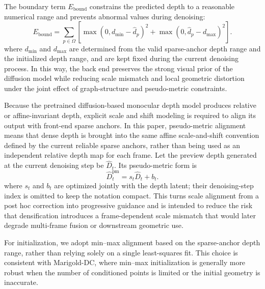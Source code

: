 \documentclass[pdflatex,sn-mathphys-num]{sn-jnl}
\begin{document}
The boundary term $E_{\mathrm{bound}}$ constrains the predicted depth to a reasonable numerical range and prevents abnormal values during denoising:
\begin{equation}
E_{\mathrm{bound}} = \sum_{p\in\Omega} \left[\max\left(0, d_{\min} - \hat d_p\right)^2 + \max\left(0, \hat d_p - d_{\max}\right)^2\right].
\label{eq:bound}
\end{equation}
where $d_{\min}$ and $d_{\max}$ are determined from the valid sparse-anchor depth range and the initialized depth range, and are kept fixed during the current denoising process. In this way, the back end preserves the strong visual prior of the diffusion model while reducing scale mismatch and local geometric distortion under the joint effect of graph-structure and pseudo-metric constraints.

Because the pretrained diffusion-based monocular depth model produces relative or affine-invariant depth, explicit scale and shift modeling is required to align its output with front-end sparse anchors. In this paper, pseudo-metric alignment means that dense depth is brought into the same affine scale-and-shift convention defined by the current reliable sparse anchors, rather than being used as an independent relative depth map for each frame. Let the preview depth generated at the current denoising step be $\hat D_t$. Its pseudo-metric form is
\begin{equation}
\hat D_t^{\mathrm{pm}} = s_t \hat D_t + b_t.
\label{eq:pmetric}
\end{equation}
where $s_t$ and $b_t$ are optimized jointly with the depth latent; their denoising-step index is omitted to keep the notation compact. This turns scale alignment from a post hoc correction into progressive guidance and is intended to reduce the risk that densification introduces a frame-dependent scale mismatch that would later degrade multi-frame fusion or downstream geometric use.

For initialization, we adopt min--max alignment based on the sparse-anchor depth range, rather than relying solely on a single least-squares fit. This choice is consistent with Marigold-DC, where min--max initialization is generally more robust when the number of conditioned points is limited or the initial geometry is inaccurate.
\end{document}
